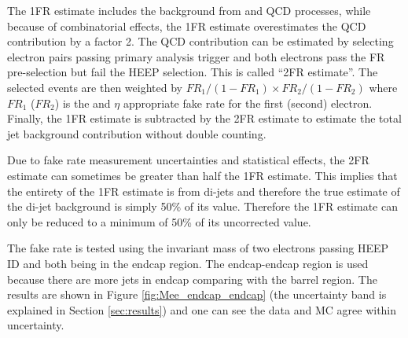 The 1FR estimate includes the background from \wjets and QCD processes, while because of combinatorial effects, the 1FR estimate overestimates the QCD contribution by a factor 2. The QCD contribution can be estimated by selecting electron pairs passing primary analysis trigger and both electrons pass the FR pre-selection but fail the HEEP selection. This is called ``2FR estimate''. The selected events are then weighted by $FR_{1}/(1-FR_{1}) \times FR_{2}/(1-FR_{2})$ where $FR_{1}$ ($FR_{2}$) is the \et and $\eta$ appropriate fake rate for the first (second) electron. Finally, the 1FR estimate is subtracted by the 2FR estimate to estimate the total jet background contribution without double counting.

Due to fake rate measurement uncertainties and statistical effects, the 2FR estimate can sometimes be greater than half the 1FR estimate. This implies that the entirety of the 1FR estimate is from di-jets and therefore the true estimate of the di-jet background is simply 50\% of its value. Therefore the 1FR estimate can only be reduced to a minimum of 50\% of its uncorrected value.

The fake rate is tested using the invariant mass of two electrons passing HEEP ID and both being in the endcap region. The endcap-endcap region is used because there are more jets in endcap comparing with the barrel region. The results are shown in Figure \ref{fig:Mee_endcap_endcap} (the uncertainty band is explained in Section \ref{sec:results}) and one can see the data and MC agree within uncertainty.

